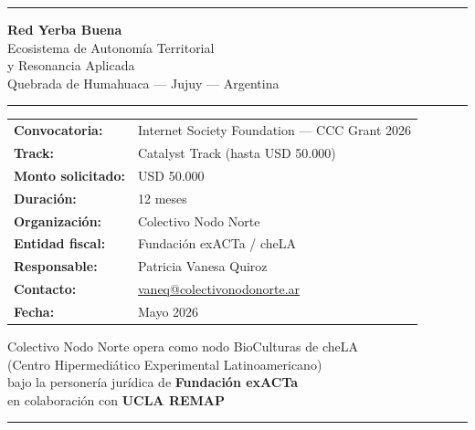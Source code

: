 \documentclass[12pt,a4paper]{article}
\begin{document}

\begin{titlepage}
  \centering
  \vspace*{2cm}

  {\color{primary}\rule{\linewidth}{2pt}}
  \vspace{0.5cm}

  {\Huge\bfseries\color{primary} Red Yerba Buena}\\[0.4cm]
  {\large\color{secondary} Ecosistema de Autonomía Territorial\\y Resonancia Aplicada}\\[0.3cm]
  {\normalsize\color{darkgray} Quebrada de Humahuaca --- Jujuy --- Argentina}

  \vspace{0.5cm}
  {\color{primary}\rule{\linewidth}{2pt}}

  \vspace{2cm}

  \begin{tabular}{ll}
    \textbf{Convocatoria:}   & Internet Society Foundation --- CCC Grant 2026 \\[4pt]
    \textbf{Track:}          & Catalyst Track (hasta USD 50.000) \\[4pt]
    \textbf{Monto solicitado:} & USD 50.000 \\[4pt]
    \textbf{Duración:}       & 12 meses \\[4pt]
    \textbf{Organización:}   & Colectivo Nodo Norte \\[4pt]
    \textbf{Entidad fiscal:} & Fundación exACTa / cheLA \\[4pt]
    \textbf{Responsable:}    & Patricia Vanesa Quiroz \\[4pt]
    \textbf{Contacto:}       & \href{mailto:vaneq@colectivonodonorte.ar}{vaneq@colectivonodonorte.ar} \\[4pt]
    \textbf{Fecha:}          & Mayo 2026 \\
  \end{tabular}

  \vfill

  {\small\color{darkgray}
    Colectivo Nodo Norte opera como nodo BioCulturas de cheLA\\
    (Centro Hipermediático Experimental Latinoamericano)\\
    bajo la personería jurídica de \textbf{Fundación exACTa}\\
    en colaboración con \textbf{UCLA REMAP}
  }

  \vspace{1cm}
  {\color{primary}\rule{\linewidth}{1pt}}
\end{titlepage}
\end{document}

